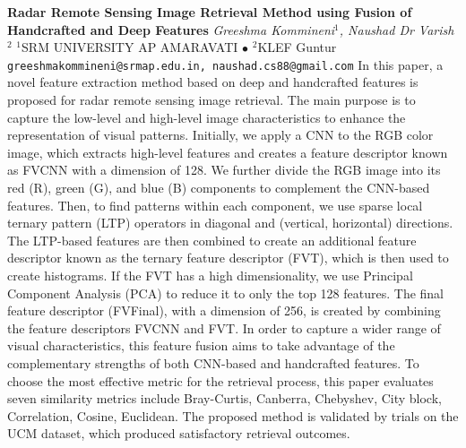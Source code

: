 
    \begin{conf-abstract}[]
        {\textbf{Radar Remote Sensing Image Retrieval Method using Fusion of Handcrafted and Deep Features}}
        {\textit{Greeshma Kommineni$^{1}$, Naushad Dr Varish$^{2}$}}
        {$^{1}$SRM UNIVERSITY AP AMARAVATI $\bullet$ $^{2}$KLEF Guntur}
        {\texttt{greeshmakommineni@srmap.edu.in, naushad.cs88@gmail.com}}
        {In this paper, a novel feature extraction method based on deep and handcrafted features is proposed for radar remote sensing image retrieval. The main purpose is to capture the low-level and high-level image characteristics to enhance the representation of visual patterns. Initially, we apply a CNN to the RGB color image, which extracts high-level features and creates a feature descriptor known as FVCNN with a dimension of 128. We further divide the RGB image into its red (R), green (G), and blue (B) components to complement the CNN-based features. Then, to find patterns within each component, we use sparse local ternary pattern (LTP) operators in diagonal and (vertical, horizontal) directions. The LTP-based features are then combined to create an additional feature descriptor known as the ternary feature descriptor (FVT), which is then used to create histograms. If the FVT has a high dimensionality, we use Principal Component Analysis (PCA) to reduce it to only the top 128 features. The final feature descriptor (FVFinal), with a dimension of 256, is created by combining the feature descriptors FVCNN and FVT. In order to capture a wider range of visual characteristics, this feature fusion aims to take advantage of the complementary strengths of both CNN-based and handcrafted features. To choose the most effective metric for the retrieval process, this paper evaluates seven similarity metrics include Bray-Curtis, Canberra, Chebyshev, City block, Correlation, Cosine, Euclidean. The proposed method is validated by trials on the UCM dataset, which produced satisfactory retrieval outcomes.}
    \end{conf-abstract}
        